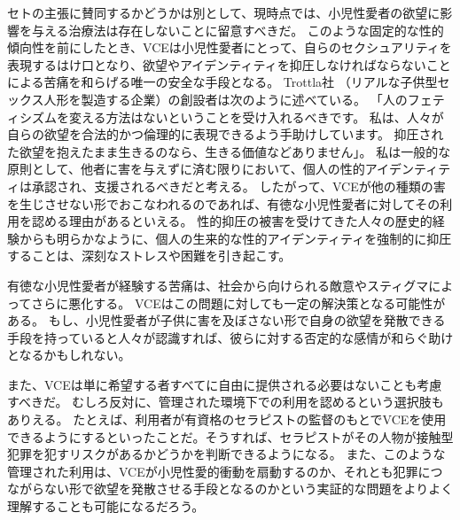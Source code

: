 \documentclass[paper=a4,book,openany]{jlreq}
\begin{document}
セトの主張に賛同するかどうかは別として、現時点では、小児性愛者の欲望に影響を与える治療法は存在しないことに留意すべきだ\citep[p.1155]{tiehen18:_virtual_ethic_creep_act}。
このような固定的な性的傾向性を前にしたとき、VCEは小児性愛者にとって、自らのセクシュアリティを表現するはけ口となり、欲望やアイデンティティを抑圧しなければならないことによる苦痛を和らげる唯一の安全な手段となる。
Trottla社 （リアルな子供型セックス人形を製造する企業）の創設者は次のように述べている。
「人のフェティシズムを変える方法はないということを受け入れるべきです。
私は、人々が自らの欲望を合法的かつ倫理的に表現できるよう手助けしています。
抑圧された欲望を抱えたまま生きるのなら、生きる価値などありません」\citep{morin16:_can_child_dolls_keep_pedop_offen}。
私は一般的な原則として、他者に害を与えずに済む限りにおいて、個人の性的アイデンティティは承認され、支援されるべきだと考える。
したがって、VCEが他の種類の害を生じさせない形でおこなわれるのであれば、有徳な小児性愛者に対してその利用を認める理由があるといえる。
性的抑圧の被害を受けてきた人々の歴史的経験からも明らかなように、個人の生来的な性的アイデンティティを強制的に抑圧することは、深刻なストレスや困難を引き起こす。

有徳な小児性愛者が経験する苦痛は、社会から向けられる敵意やスティグマによってさらに悪化する。
VCEはこの問題に対しても一定の解決策となる可能性がある。
もし、小児性愛者が子供に害を及ぼさない形で自身の欲望を発散できる手段を持っていると人々が認識すれば、彼らに対する否定的な感情が和らぐ助けとなるかもしれない。

また、VCEは単に希望する者すべてに自由に提供される必要はないことも考慮すべきだ。
むしろ反対に、管理された環境下での利用を認めるという選択肢もありえる。
たとえば、利用者が有資格のセラピストの監督のもとでVCEを使用できるようにするといったことだ。そうすれば、セラピストがその人物が接触型犯罪を犯すリスクがあるかどうかを判断できるようになる。
また、このような管理された利用は、VCEが小児性愛的衝動を扇動するのか、それとも犯罪につながらない形で欲望を発散させる手段となるのかという実証的な問題をよりよく理解することも可能になるだろう。
\end{document}
